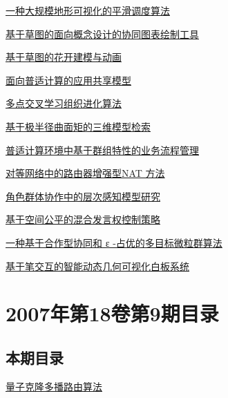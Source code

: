 \documentclass[a4paper]{article}
\begin{document}
\href{http://www.jos.org.cn/ch/reader/download_pdf.aspx?file_no=2007s104&year_id=2007&quarter_id=zk&falg=1}{一种大规模地形可视化的平滑调度算法}

\href{http://www.jos.org.cn/ch/reader/download_pdf.aspx?file_no=2007s105&year_id=2007&quarter_id=zk&falg=1}{基于草图的面向概念设计的协同图表绘制工具}

\href{http://www.jos.org.cn/ch/reader/download_pdf.aspx?file_no=2007s106&year_id=2007&quarter_id=zk&falg=1}{基于草图的花开建模与动画}

\href{http://www.jos.org.cn/ch/reader/download_pdf.aspx?file_no=2007s107&year_id=2007&quarter_id=zk&falg=1}{面向普适计算的应用共享模型}

\href{http://www.jos.org.cn/ch/reader/download_pdf.aspx?file_no=2007s108&year_id=2007&quarter_id=zk&falg=1}{多点交叉学习组织进化算法}

\href{http://www.jos.org.cn/ch/reader/download_pdf.aspx?file_no=2007s109&year_id=2007&quarter_id=zk&falg=1}{基于极半径曲面矩的三维模型检索}

\href{http://www.jos.org.cn/ch/reader/download_pdf.aspx?file_no=2007s110&year_id=2007&quarter_id=zk&falg=1}{普适计算环境中基于群组特性的业务流程管理}

\href{http://www.jos.org.cn/ch/reader/download_pdf.aspx?file_no=2007s111&year_id=2007&quarter_id=zk&falg=1}{对等网络中的路由器增强型NAT 方法}

\href{http://www.jos.org.cn/ch/reader/download_pdf.aspx?file_no=2007s112&year_id=2007&quarter_id=zk&falg=1}{角色群体协作中的层次感知模型研究}

\href{http://www.jos.org.cn/ch/reader/download_pdf.aspx?file_no=2007s113&year_id=2007&quarter_id=zk&falg=1}{基于空间公平的混合发言权控制策略}

\href{http://www.jos.org.cn/ch/reader/download_pdf.aspx?file_no=2007s114&year_id=2007&quarter_id=zk&falg=1}{一种基于合作型协同和 ε -占优的多目标微粒群算法}

\href{http://www.jos.org.cn/ch/reader/download_pdf.aspx?file_no=2007s115&year_id=2007&quarter_id=zk&falg=1}{基于笔交互的智能动态几何可视化白板系统}


\section{\textbf{2007年第18卷第9期目录}}
\subsection{本期目录}
\href{http://www.jos.org.cn/ch/reader/download_pdf.aspx?file_no=20070901&year_id=2007&quarter_id=9&falg=1}{量子克隆多播路由算法}
\end{document}
